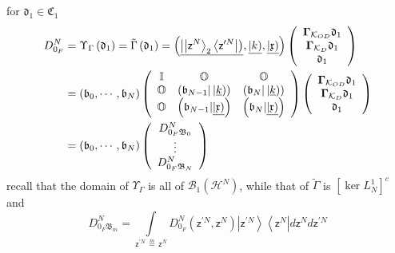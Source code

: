 \documentclass[aps,preprint]{revtex4}%
\begin{document}
for $\mathfrak{d}_{1}\mathfrak{\in C}_{1}$
\begin{align}
D_{0_{F}}^{N}  &  =\Upsilon_{\Gamma}\left(  \mathfrak{d}_{1}\right)
=\tilde{\Gamma}\left(  \mathfrak{d}_{1}\right)  =\left(  \underline{\left\vert
\left\vert \mathsf{z}^{N}\right\rangle _{2}\left\langle \mathsf{z}^{\prime
N}\right\vert \right)  },\underline{\left\vert k\right)  },\underline
{\left\vert \mathfrak{x}\right)  }\right)  \left(
\begin{array}
[c]{c}%
\mathbf{\Gamma}_{\mathcal{K}_{OD}}\mathfrak{d}_{1}\\
\mathbf{\Gamma}_{\mathcal{K}_{D}}\mathfrak{d}_{1}\\
\mathfrak{d}_{1}%
\end{array}
\right) \nonumber\\
&  =\left(  \mathfrak{b}_{0},\cdots,\mathfrak{b}_{N}\right)  \left(
\begin{array}
[c]{ccc}%
\mathbb{I} & \mathbb{O} & \mathbb{O}\\
\mathbb{O} & \left(  \mathfrak{b}_{N-1}|\left\vert \underline{k}\right)
\right)  & \left(  \mathfrak{b}_{N}|\left\vert \underline{k}\right)  \right)
\\
\mathbb{O} & \left(  \mathfrak{b}_{N-1}|\underline{\left\vert \mathfrak{x}%
\right)  }\right)  & \left(  \mathfrak{b}_{N}|\underline{\left\vert
\mathfrak{x}\right)  }\right)
\end{array}
\right)  \left(
\begin{array}
[c]{c}%
\mathbf{\Gamma}_{\mathcal{K}_{OD}}\mathfrak{d}_{1}\\
\mathbf{\Gamma}_{\mathcal{K}_{D}}\mathfrak{d}_{1}\\
\mathfrak{d}_{1}%
\end{array}
\right) \nonumber\\
&  =\left(  \mathfrak{b}_{0},\cdots,\mathfrak{b}_{N}\right)  \left(
\begin{array}
[c]{c}%
D_{0_{F}\mathfrak{B}_{0}}^{N}\\
\vdots\\
D_{0_{F}\mathfrak{B}_{N}}^{N}%
\end{array}
\right)
\end{align}
recall that the domain of $\Upsilon_{\Gamma}$ is all of $\mathcal{B}%
_{1}\left(  \mathcal{H}^{N}\right)  $, while that of $\tilde{\Gamma}$ is
$\left[  \ker L_{N}^{1}\right]  ^{c}$ and
\begin{equation}
D_{0_{F}\mathfrak{B}_{m}}^{N}=%
{\displaystyle\int\limits_{\mathsf{z}^{\prime N}\,\overset{m}{=}%
\,\mathsf{z}^{N}}}
D_{0_{F}}^{N}\left(  \mathsf{z}^{\prime N},\mathsf{z}^{N}\right)  \left\vert
\mathsf{z}^{\prime N}\right\rangle \left\langle \mathsf{z}^{N}\right\vert
d\mathsf{z}^{N}d\mathsf{z}^{\prime N}%
\end{equation}
\end{document}
